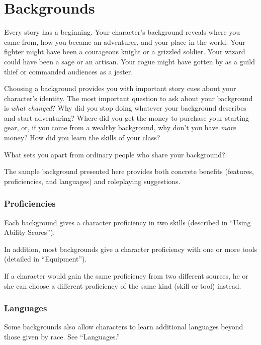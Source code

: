 \documentclass[
]{article}
\date{}
\begin{document}
\hypertarget{backgrounds}{%
\section{Backgrounds}\label{backgrounds}}

Every story has a beginning. Your character's background reveals where
you came from, how you became an adventurer, and your place in the
world. Your fighter might have been a courageous knight or a grizzled
soldier. Your wizard could have been a sage or an artisan. Your rogue
might have gotten by as a guild thief or commanded audiences as a
jester.

Choosing a background provides you with important story cues about your
character's identity. The most important question to ask about your
background is \emph{what changed}? Why did you stop doing whatever your
background describes and start adventuring? Where did you get the money
to purchase your starting gear, or, if you come from a wealthy
background, why don't you have \emph{more} money? How did you learn the
skills of your class?

What sets you apart from ordinary people who share your background?

The sample background presented here provides both concrete benefits
(features, proficiencies, and languages) and roleplaying suggestions.

\hypertarget{proficiencies}{%
\subsubsection{Proficiencies}\label{proficiencies}}

Each background gives a character proficiency in two skills (described
in ``Using Ability Scores'').

In addition, most backgrounds give a character proficiency with one or
more tools (detailed in ``Equipment'').

If a character would gain the same proficiency from two different
sources, he or she can choose a different proficiency of the same kind
(skill or tool) instead.

\hypertarget{languages}{%
\subsubsection{Languages}\label{languages}}

Some backgrounds also allow characters to learn additional languages
beyond those given by race. See ``Languages.''
\end{document}

